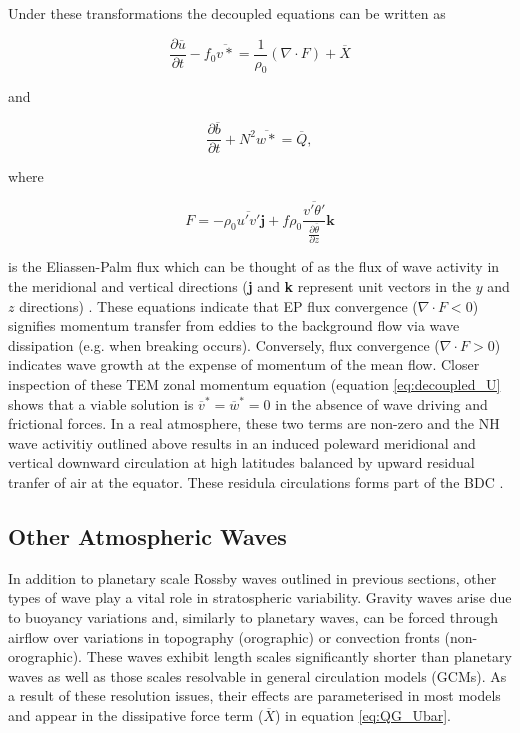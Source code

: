 Under these transformations the decoupled equations can be written as

\begin{equation} \label{eq:decoupled_U}
\frac{\partial \overline{u}}{\partial t} - f_0 \overline{v*} = \frac{1}{\rho_0} (\nabla \cdot F) + \overline{X}
\end{equation}

and

\begin{equation} \label{eq:decoupled_b}
\frac{\partial \overline{b}}{\partial t} + N^2 \overline{w*} = \overline{Q},
\end{equation}

where

\begin{equation} \label{eq:EP_flux}
F = -\rho_0 \overline{u'v'}\textbf{j} + f\rho_0\frac{\overline{v'\theta'}}{\frac{\partial{\overline{\theta}}}{\partial{z}}} \textbf{k}
\end{equation}

\noindent is the Eliassen-Palm flux which can be thought of as the flux of wave activity in the meridional and vertical directions (\textbf{j} and \textbf{k} represent unit vectors in the $y$ and $z$ directions) \citep{andrewsPlanetary1976}. These equations indicate that EP flux convergence ($\nabla \cdot F < 0$) signifies momentum transfer from eddies to the background flow via wave dissipation (e.g. when breaking occurs). Conversely, flux convergence ($\nabla \cdot F > 0$) indicates wave growth at the expense of momentum of the mean flow. Closer inspection of these TEM zonal momentum equation (equation \ref{eq:decoupled_U} shows that a viable solution is $\overline{v}^{*} = \overline{w}^{*} = 0$ in the absence of wave driving and frictional forces. In a real atmosphere, these two terms are non-zero and the NH wave activitiy outlined above results in an induced poleward meridional and vertical downward circulation at high latitudes balanced by upward residual tranfer of air at the equator. These residula circulations forms part of the BDC \citep{butchartBrewerDobson2014}. 

\subsection{Other Atmospheric Waves} \label{sec:other_waves}
In addition to planetary scale Rossby waves outlined in previous sections, other types of wave play a vital role in stratospheric variability. Gravity waves arise due to buoyancy variations and, similarly to planetary waves, can be forced through airflow over variations in topography (orographic) or convection fronts (non-orographic). These waves exhibit length scales significantly shorter than planetary waves as well as those scales resolvable in general circulation models (GCMs). As a result of these resolution issues,  their effects are parameterised in most models and appear in the dissipative force term ($\overline{X}$) in equation \ref{eq:QG_Ubar}.

